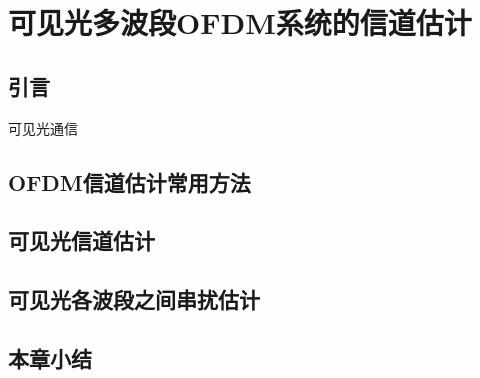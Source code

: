 \chapter{可见光多波段OFDM系统的信道估计}
\section{引言}
可见光通信
\section{OFDM信道估计常用方法}
\section{可见光信道估计}
\section{可见光各波段之间串扰估计}
\section{本章小结}
